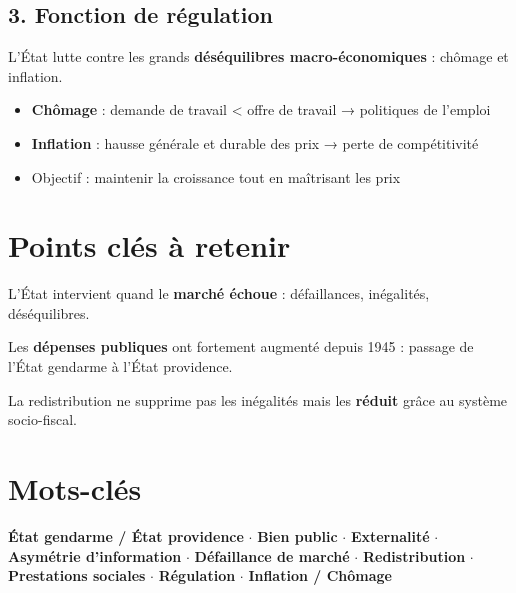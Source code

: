 \documentclass[11pt,a4paper]{article}
\begin{document}
\subsection*{3. Fonction de régulation}
\begin{keybox}
L'État lutte contre les grands \textbf{déséquilibres macro-économiques} : chômage et inflation.
\end{keybox}
\begin{itemize}
  \item \textbf{Chômage} : demande de travail < offre de travail → politiques de l'emploi
  \item \textbf{Inflation} : hausse générale et durable des prix → perte de compétitivité
  \item Objectif : maintenir la croissance tout en maîtrisant les prix
\end{itemize}

\section*{Points clés à retenir}

\begin{keybox}
L'État intervient quand le \textbf{marché échoue} : défaillances, inégalités, déséquilibres.
\end{keybox}
\vspace{3pt}
\begin{keybox}
Les \textbf{dépenses publiques} ont fortement augmenté depuis 1945 : passage de l'État gendarme à l'État providence.
\end{keybox}
\vspace{3pt}
\begin{keybox}
La redistribution ne supprime pas les inégalités mais les \textbf{réduit} grâce au système socio-fiscal.
\end{keybox}

\section*{Mots-clés}
\textcolor{mainColor}{\textbf{État gendarme / État providence}} $\cdot$
\textcolor{mainColor}{\textbf{Bien public}} $\cdot$
\textcolor{mainColor}{\textbf{Externalité}} $\cdot$
\textcolor{mainColor}{\textbf{Asymétrie d'information}} $\cdot$
\textcolor{mainColor}{\textbf{Défaillance de marché}} $\cdot$
\textcolor{mainColor}{\textbf{Redistribution}} $\cdot$
\textcolor{mainColor}{\textbf{Prestations sociales}} $\cdot$
\textcolor{mainColor}{\textbf{Régulation}} $\cdot$
\textcolor{mainColor}{\textbf{Inflation / Chômage}}
\end{document}

